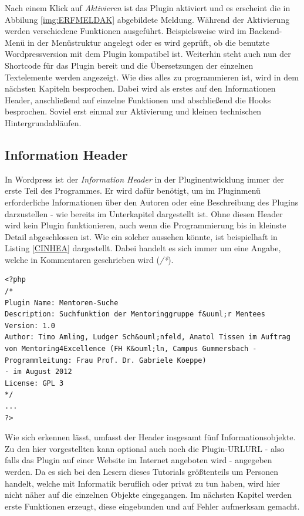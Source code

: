 Nach einem Klick auf \emph{Aktivieren} ist das Plugin aktiviert und es erscheint die in Abbilung \ref{img:ERFMELDAK} abgebildete Meldung.
Während der Aktivierung werden verschiedene Funktionen ausgeführt. Beispielsweise wird im Backend-Menü in der Menüstruktur angelegt oder es wird geprüft, ob die benutzte Wordpressversion mit dem Plugin kompatibel ist. Weiterhin steht auch nun der Shortcode für das Plugin bereit und die Übersetzungen der einzelnen Textelemente werden angezeigt. \newline
Wie dies alles zu programmieren ist, wird in dem nächsten Kapiteln besprochen. Dabei wird als erstes auf den Informationen Header, anschließend auf einzelne Funktionen und abschließend die Hooks besprochen. Soviel erst einmal zur Aktivierung und kleinen technischen Hintergrundabläufen. 
\subsection{Information Header}\label{ACHE}
In Wordpress ist der {\emph{Information Header}} in der Pluginentwicklung immer der erste Teil des Programmes. Er wird dafür benötigt, um im Pluginmenü erforderliche Informationen über den Autoren oder eine Beschreibung des Plugins darzustellen - wie bereits im Unterkapitel  dargestellt ist. Ohne diesen Header wird kein Plugin funktionieren, auch wenn die Programmierung bis in kleinste Detail abgeschlossen ist. \newline
Wie ein solcher aussehen könnte, ist beispielhaft in Listing \ref{CINHEA} dargestellt. Dabei handelt es sich immer um eine Angabe, welche in Kommentaren geschrieben wird (\emph{/*}).
\begin{lstlisting}
<?php
/*
Plugin Name: Mentoren-Suche
Description: Suchfunktion der Mentoringgruppe f&uuml;r Mentees
Version: 1.0
Author: Timo Amling, Ludger Sch&ouml;nfeld, Anatol Tissen im Auftrag von Mentoring4Excellence (FH K&ouml;ln, Campus Gummersbach - Programmleitung: Frau Prof. Dr. Gabriele Koeppe)
- im August 2012
License: GPL 3
*/
...
?>
\end{lstlisting}
Wie sich erkennen lässt, umfasst der Header insgesamt fünf Informationsobjekte. Zu den hier vorgestellten kann optional auch noch die Plugin-URL\gls{URL} - also falls das Plugin auf einer Website im Internet angeboten wird - angegeben werden.
Da es sich bei den Lesern dieses Tutorials größtenteils um Personen handelt, welche mit Informatik beruflich oder privat zu tun haben, wird hier nicht näher auf die einzelnen Objekte eingegangen.\newline
Im nächsten Kapitel werden erste Funktionen erzeugt, diese eingebunden und auf Fehler aufmerksam gemacht. 
